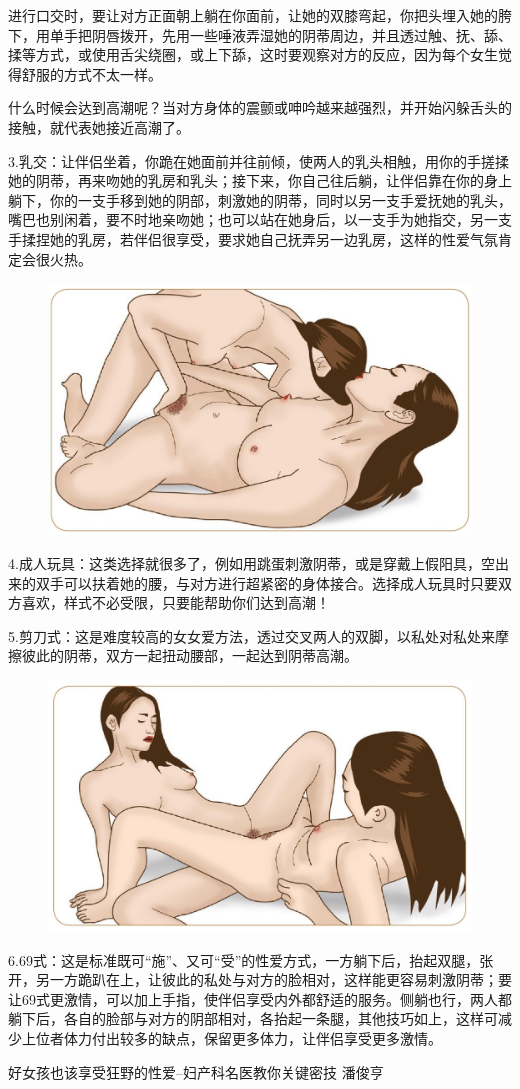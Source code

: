 \documentclass[12pt,UTF8]{ctexbook}
\begin{document}
进行口交时，要让对方正面朝上躺在你面前，让她的双膝弯起，你把头埋入她的胯下，用单手把阴唇拨开，先用一些唾液弄湿她的阴蒂周边，并且透过触、抚、舔、揉等方式，或使用舌尖绕圈，或上下舔，这时要观察对方的反应，因为每个女生觉得舒服的方式不太一样。

什么时候会达到高潮呢？当对方身体的震颤或呻吟越来越强烈，并开始闪躲舌头的接触，就代表她接近高潮了。

3.乳交：让伴侣坐着，你跪在她面前并往前倾，使两人的乳头相触，用你的手搓揉她的阴蒂，再来吻她的乳房和乳头；接下来，你自己往后躺，让伴侣靠在你的身上躺下，你的一支手移到她的阴部，刺激她的阴蒂，同时以另一支手爱抚她的乳头，嘴巴也别闲着，要不时地亲吻她；也可以站在她身后，以一支手为她指交，另一支手揉捏她的乳房，若伴侣很享受，要求她自己抚弄另一边乳房，这样的性爱气氛肯定会很火热。

\begin{figure}[H]
	\centering
	\includegraphics[width=0.7\linewidth]{11}
	\caption{}
	\label{fig:1}
\end{figure}

4.成人玩具：这类选择就很多了，例如用跳蛋刺激阴蒂，或是穿戴上假阳具，空出来的双手可以扶着她的腰，与对方进行超紧密的身体接合。选择成人玩具时只要双方喜欢，样式不必受限，只要能帮助你们达到高潮！

5.剪刀式：这是难度较高的女女爱方法，透过交叉两人的双脚，以私处对私处来摩擦彼此的阴蒂，双方一起扭动腰部，一起达到阴蒂高潮。

\begin{figure}[H]
	\centering
	\includegraphics[width=0.7\linewidth]{12}
	\caption{}
	\label{fig:1}
\end{figure}

6.69式：这是标准既可“施”、又可“受”的性爱方式，一方躺下后，抬起双腿，张开，另一方跪趴在上，让彼此的私处与对方的脸相对，这样能更容易刺激阴蒂；要让69式更激情，可以加上手指，使伴侣享受内外都舒适的服务。侧躺也行，两人都躺下后，各自的脸部与对方的阴部相对，各抬起一条腿，其他技巧如上，这样可减少上位者体力付出较多的缺点，保留更多体力，让伴侣享受更多激情。

\backmatter

好女孩也该享受狂野的性爱--妇产科名医教你关键密技  潘俊亨
\end{document}

